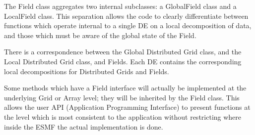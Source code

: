 


The Field class aggregates two internal subclasses: a GlobalField class
and a LocalField class.  This separation allows the code to clearly
differentiate between functions which operate internal to a single DE
on a local decomposition of data, and those which must be aware of the
global state of the Field.  
 
There is a correspondence between the Global Distributed Grid class,
and the Local Distributed Grid class, and Fields.  Each DE contains
the corresponding local decompositions for Distributed Grids and Fields.

Some methods which have a Field interface will actually be
implemented at the underlying Grid or Array level; they
will be inherited by the Field class.  This allows the user
API (Application Programming Interface) to present functions at
the level which is most consistent to the application without
restricting where inside the ESMF the actual implementation
is done.
